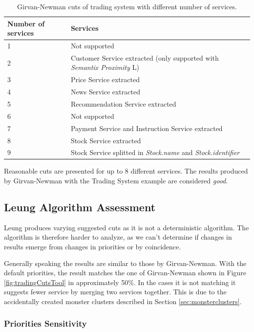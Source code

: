 \begin{table}[H]
	\centering
	\caption{Girvan-Newman cuts of trading system with different number of services.}
	\label{tab:tradingNumberOfServices}
	\begin{tabular}{|p{60pt}|p{200pt}|}
		\hline	
		\textbf{Number of services} & \textbf{Services}  \\
		\hline
		1 & Not supported \\
		\hline
		2 & Customer Service extracted (only supported with \textit{Semantix Proximity} L) \\
		\hline
		3 & Price Service extracted  \\
		\hline
		4 & News Service extracted  \\
		\hline
		5 & Recommendation Service extracted  \\
		\hline
		6 & Not supported\\
		\hline
		7 & Payment Service and Instruction Service extracted \\
		\hline
		8 & Stock Service extracted \\
		\hline
		9 & Stock Service splitted in \textit{Stock.name} and \textit{Stock.identifier} \\
		\hline
	\end{tabular}
\end{table}

Reasonable cuts are presented for up to 8 different services. The results produced by Girvan-Newman with the Trading System example are considered \textit{good}.

\subsection{Leung Algorithm Assessment}

Leung produces varying suggested cuts as it is not a deterministic algorithm. The algorithm is therefore harder to analyze, as we can't determine if changes in results emerge from changes in priorities or by coincidence. 

Generally speaking the results are similar to those by Girvan-Newman. With the default priorities, the result matches the one of Girvan-Newman shown in Figure \ref{fig:tradingCutsTool} in approximately 50\%. In the cases it is not matching it suggests fewer service by merging two services together. This is due to the accidentally created monster clusters described in Section \ref{sec:monsterclusters}.

\subsubsection{Priorities Sensitivity}

